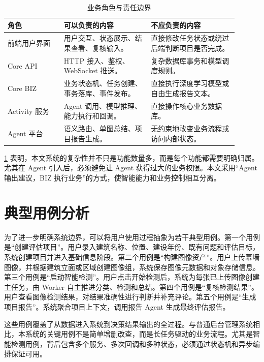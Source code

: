 \begin{table}[!htb]
  \caption{业务角色与责任边界}\label{tab:role-boundary}
  \centering
  \begin{tabular}{@{}p{0.22\linewidth}p{0.34\linewidth}p{0.34\linewidth}@{}} \toprule
    \textbf{角色} & \textbf{可以负责的内容} & \textbf{不应负责的内容} \\ \midrule
    前端用户界面 & 用户交互、状态展示、结果查看、复核输入。 & 直接修改任务状态或绕过后端判断项目是否完成。 \\
    Core API & HTTP 接入、鉴权、WebSocket 推送。 & 复杂数据库事务和模型调度规则。 \\
    Core BIZ & 业务状态机、任务创建、事务落库、事件发布。 & 直接执行深度学习模型或自由生成报告文本。 \\
    Activity 服务 & Agent 调用、模型推理、能力执行和回调。 & 直接操作核心业务数据库。 \\
    Agent 平台 & 语义路由、单图总结、项目报告生成。 & 无约束地改变业务流程或访问内部状态。 \\ \bottomrule
  \end{tabular}
\end{table}

\cref{tab:role-boundary} 表明，本文系统的复杂性并不只是功能数量多，而是每个功能都需要明确归属。尤其在 Agent 引入后，必须避免让 Agent 获得过大的业务权限。本文采用“Agent 输出建议，BIZ 执行业务”的方式，使智能能力和业务控制相互分离。

\section{典型用例分析}
\label{sec:use-case-analysis}

为了进一步明确系统边界，可以将用户使用过程抽象为若干典型用例。第一个用例是“创建评估项目”。用户录入建筑名称、位置、建设年份、既有问题和评估目标，系统创建项目并进入基础信息阶段。第二个用例是“构建图像资产”。用户上传幕墙图像，并根据建筑立面或区域创建图像组，系统保存图像元数据和对象存储信息。第三个用例是“启动智能检测”。用户点击开始检测后，系统为每张已上传图像创建主任务，由 Worker 自主推进分类、检测和总结。第四个用例是“复核检测结果”。用户查看图像检测结果，对结果准确性进行判断并补充评论。第五个用例是“生成项目报告”。系统聚合项目上下文，调用报告 Agent 生成最终评估报告。

这些用例覆盖了从数据进入系统到决策结果输出的全过程。与普通后台管理系统相比，本系统的关键用例不是简单增删改查，而是长任务驱动的业务流程。尤其是智能检测用例，背后包含多个服务、多次回调和多种状态，必须通过状态机和异步编排保证可用。


